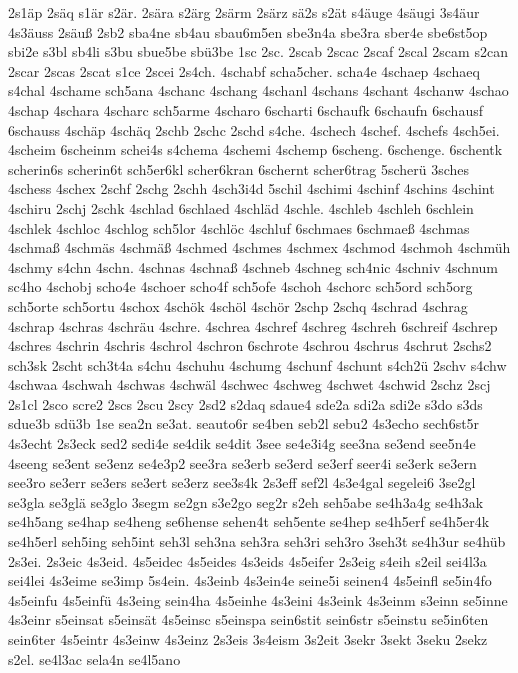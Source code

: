 {2s1äp
2säq
s1är
s2är.
2sära
s2ärg
2särm
2särz
sä2s
s2ät
s4äuge
4säugi
3s4äur
4s3äuss
2säuß
2sb2
sba4ne
sb4au
sbau6m5en
sbe3n4a
sbe3ra
sber4e
sbe6st5op
sbi2e
s3bl
sb4li
s3bu
sbue5be
sbü3be
1sc
2sc.
2scab
2scac
2scaf
2scal
2scam
s2can
2scar
2scas
2scat
s1ce
2scei
2s4ch.
4schabf
scha5cher.
scha4e
4schaep
4schaeq
s4chal
4schame
sch5ana
4schanc
4schang
4schanl
4schans
4schant
4schanw
4schao
4schap
4schara
4scharc
sch5arme
4scharo
6scharti
6schaufk
6schaufn
6schausf
6schauss
4schäp
4schäq
2schb
2schc
2schd
s4che.
4schech
4schef.
4schefs
4sch5ei.
4scheim
6scheinm
schei4s
s4chema
4schemi
4schemp
6scheng.
6schenge.
6schentk
scherin6s
scherin6t
sch5er6kl
scher6kran
6schernt
scher6trag
5scherü
3sches
4schess
4schex
2schf
2schg
2schh
4sch3i4d
5schil
4schimi
4schinf
4schins
4schint
4schiru
2schj
2schk
4schlad
6schlaed
4schläd
4schle.
4schleb
4schleh
6schlein
4schlek
4schloc
4schlog
sch5lor
4schlöc
4schluf
6schmaes
6schmaeß
4schmas
4schmaß
4schmäs
4schmäß
4schmed
4schmes
4schmex
4schmod
4schmoh
4schmüh
4schmy
s4chn
4schn.
4schnas
4schnaß
4schneb
4schneg
sch4nic
4schniv
4schnum
sc4ho
4schobj
scho4e
4schoer
scho4f
sch5ofe
4schoh
4schorc
sch5ord
sch5org
sch5orte
sch5ortu
4schox
4schök
4schöl
4schör
2schp
2schq
4schrad
4schrag
4schrap
4schras
4schräu
4schre.
4schrea
4schref
4schreg
4schreh
6schreif
4schrep
4schres
4schrin
4schris
4schrol
4schron
6schrote
4schrou
4schrus
4schrut
2schs2
sch3sk
2scht
sch3t4a
s4chu
4schuhu
4schumg
4schunf
4schunt
s4ch2ü
2schv
s4chw
4schwaa
4schwah
4schwas
4schwäl
4schwec
4schweg
4schwet
4schwid
2schz
2scj
2s1cl
2sco
scre2
2scs
2scu
2scy
2sd2
s2daq
sdaue4
sde2a
sdi2a
sdi2e
s3do
s3ds
sdue3b
sdü3b
1se
sea2n
se3at.
seauto6r
se4ben
seb2l
sebu2
4s3echo
sech6st5r
4s3echt
2s3eck
sed2
sedi4e
se4dik
se4dit
3see
se4e3i4g
see3na
se3end
see5n4e
4seeng
se3ent
se3enz
se4e3p2
see3ra
se3erb
se3erd
se3erf
seer4i
se3erk
se3ern
see3ro
se3err
se3ers
se3ert
se3erz
see3s4k
2s3eff
sef2l
4s3e4gal
segelei6
3se2gl
se3gla
se3glä
se3glo
3segm
se2gn
s3e2go
seg2r
s2eh
seh5abe
se4h3a4g
se4h3ak
se4h5ang
se4hap
se4heng
se6hense
sehen4t
seh5ente
se4hep
se4h5erf
se4h5er4k
se4h5erl
seh5ing
seh5int
seh3l
seh3na
seh3ra
seh3ri
seh3ro
3seh3t
se4h3ur
se4hüb
2s3ei.
2s3eic
4s3eid.
4s5eidec
4s5eides
4s3eids
4s5eifer
2s3eig
s4eih
s2eil
sei4l3a
sei4lei
4s3eime
se3imp
5s4ein.
4s3einb
4s3ein4e
seine5i
seinen4
4s5einfl
se5in4fo
4s5einfu
4s5einfü
4s3eing
sein4ha
4s5einhe
4s3eini
4s3eink
4s3einm
s3einn
se5inne
4s3einr
s5einsat
s5einsät
4s5einsc
s5einspa
sein6stit
sein6str
s5einstu
se5in6ten
sein6ter
4s5eintr
4s3einw
4s3einz
2s3eis
3s4eism
3s2eit
3sekr
3sekt
3seku
2sekz
s2el.
se4l3ac
sela4n
se4l5ano
}
